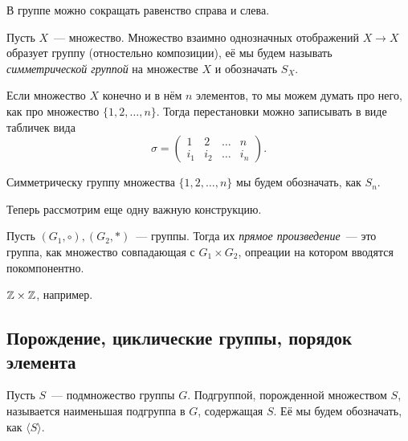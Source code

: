 	\begin{observation}
		В группе можно сокращать равенство справа и слева. 
	\end{observation}


	\begin{example}
		\begin{definition} 
		Пусть $X$~--- множество. Множество взаимно однозначных отображений $X \to X$ образует группу (отностельно композиции), её мы будем называть \emph{симметрической группой} на множестве $X$ и обозначать $S_{X}$. 
	\end{definition}

	\begin{remark}
		Если множество $X$ конечно и в нём $n$ элементов, то мы можем думать про него, как про множество $\{ 1, 2, \ldots, n \}$.  Тогда перестановки можно записывать в виде табличек вида 
		\[
			\sigma = \begin{pmatrix} 1 & 2 & \ldots & n \\ i_{1} & i_{2} & \ldots & i_{n} \end{pmatrix}.
		\]

		Симметрическу группу множества $\{ 1, 2, \ldots, n \}$ мы будем обозначать, как $S_{n}$.
	\end{remark}
	\end{example}

	Теперь рассмотрим еще одну важную конструкцию. 

	\begin{definition} 
		Пусть $(G_1, \circ), (G_2, *)$~--- группы. Тогда их \emph{прямое произведение}~--- это группа, как множество совпадающая с $G_1 \times G_2$, опреации на котором вводятся покомпонентно.   
	\end{definition}

	\begin{example}
		$\mathbb{Z} \times \mathbb{Z}$, например. 
	\end{example}
	

	\subsection{Порождение, циклические группы, порядок элемента}

	\begin{definition} 
		 Пусть $S$~--- подмножество группы $G$. Подгруппой, порожденной множеством $S$, называется наименьшая подгруппа в $G$, содержащая $S$.  Её мы будем обозначать, как $\langle S \rangle$.
	\end{definition}

